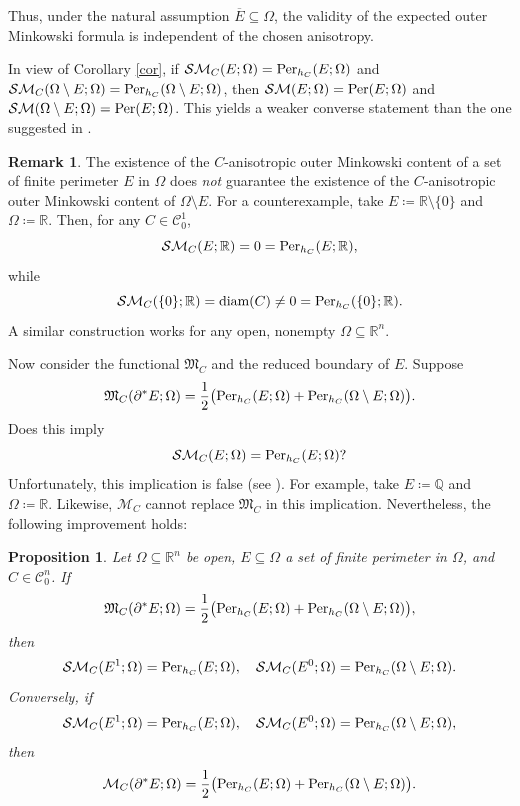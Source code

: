 \documentclass[pdflatex,sn-mathphys-num]{sn-jnl}
\theoremstyle{plain}
\newtheorem{proposition}[theorem]{Proposition}
\theoremstyle{definition}
\newtheorem{rem}[theorem]{Remark}
\DeclareMathOperator{\Per}{\textup{Per}}
\DeclareMathOperator{\diam}{\textup{diam}}
\begin{document}
\medskip
Thus, under the natural assumption $\overline{E}\subseteq\Omega$, the validity of the expected outer Minkowski formula is independent of the chosen anisotropy.

In view of Corollary \ref{cor}, if $\mathcal{SM}_{C}(E; \Omega)=\textup{Per}_{h_{C}}(E; \Omega)$ and $\mathcal{SM}_{C}(\Omega\setminus E; \Omega)=\textup{Per}_{h_{C}}(\Omega\setminus E; \Omega)$, then $\mathcal{SM}(E; \Omega)=\Per(E; \Omega)$ and $\mathcal{SM}(\Omega\setminus E; \Omega)=\Per(E; \Omega)$. This yields a weaker converse statement than the one suggested in \cite[Remark 3.5]{chambolle}.

\begin{rem}
The existence of the $C$-anisotropic outer Minkowski content of a set of finite perimeter $E$ in $\Omega$ does \emph{not} guarantee the existence of the $C$-anisotropic outer Minkowski content of $\Omega\setminus E$. For a counterexample, take $E\coloneq\mathbb{R}\setminus \{0\}$ and $\Omega\coloneq\mathbb{R}$. Then, for any $C\in\mathcal{C}^1_0$,
\[
\mathcal{SM}_C(E; \mathbb{R})=0=\textup{Per}_{h_C}(E; \mathbb{R}),
\]
while
\[
\mathcal{SM}_C(\{0\}; \mathbb{R}) = \diam(C) \neq 0 = \textup{Per}_{h_C}(\{0\}; \mathbb{R}).
\]
A similar construction works for any open, nonempty $\Omega\subseteq \mathbb{R}^n$.
\end{rem}

\medskip

Now consider the functional $\mathfrak{M}_C$ and the reduced boundary of $E$. Suppose
\[
\mathfrak{M}_C(\partial^* E; \Omega)=\frac{1}{2}\big(\textup{Per}_{h_C}(E; \Omega)+\textup{Per}_{h_C}(\Omega\setminus E; \Omega)\big).
\]
Does this imply
\[
\mathcal{SM}_C(E; \Omega)=\textup{Per}_{h_C}(E; \Omega)?
\]
Unfortunately, this implication is false (see \cite[Remark 3.6]{chambolle}). For example, take $E\coloneq \mathbb{Q}$ and $\Omega\coloneq \mathbb{R}$. Likewise, $\mathcal{M}_C$ cannot replace $\mathfrak{M}_C$ in this implication. Nevertheless, the following improvement holds:

\begin{proposition}\label{reduced}
Let $\Omega\subseteq\mathbb{R}^n$ be open, $E\subseteq\Omega$ a set of finite perimeter in $\Omega$, and $C\in\mathcal{C}^n_0$. If
\[
\mathfrak{M}_C(\partial^* E; \Omega)=\frac{1}{2}\big(\textup{Per}_{h_C}(E; \Omega)+\textup{Per}_{h_C}(\Omega\setminus E; \Omega)\big),
\]
then
\[
\mathcal{SM}_C(E^1; \Omega)=\textup{Per}_{h_C}(E; \Omega), \quad \mathcal{SM}_C(E^0; \Omega)=\textup{Per}_{h_C}(\Omega\setminus E; \Omega).
\]
Conversely, if
\[
\mathcal{SM}_C(E^1; \Omega)=\textup{Per}_{h_C}(E; \Omega), \quad \mathcal{SM}_C(E^0; \Omega)=\textup{Per}_{h_C}(\Omega\setminus E; \Omega),
\]
then
\[
\mathcal{M}_C(\partial^* E; \Omega)=\frac{1}{2}\big(\textup{Per}_{h_C}(E; \Omega)+\textup{Per}_{h_C}(\Omega\setminus E; \Omega)\big).
\]
\end{proposition}
\end{document}
